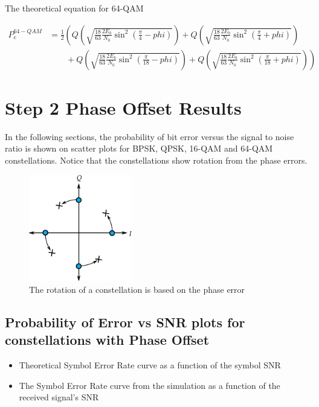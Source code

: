 \documentclass[]{article}
\begin{document}
The theoretical equation for 64-QAM

\begin{align}
P_{e}^{64-QAM} &= \frac{1}{2}\left(Q\left(\sqrt{\frac{18}{63}\frac{2E_b}{N_0}\sin^2\left(\frac{\pi}{4}-phi\right)}\right) + Q\left(\sqrt{\frac{18}{63}\frac{2E_b}{N_0}\sin^2\left(\frac{\pi}{4}+phi\right)}\right) \right. \nonumber \\
& \qquad \left. {} + Q\left(\sqrt{\frac{18}{63}\frac{2E_b}{N_0}\sin^2\left(\frac{\pi}{18}-phi\right)}\right) + Q\left(\sqrt{\frac{18}{63}\frac{2E_b}{N_0}\sin^2\left(\frac{\pi}{18}+phi\right)}\right) \right) 
\end{align}

\section{Step 2 Phase Offset Results}
\label{sec:results_po}
In the following sections, the probability of bit error versus the signal to noise ratio is shown on scatter plots for BPSK, QPSK, 16-QAM and 64-QAM constellations.  Notice that the constellations show rotation from the phase errors.  

\begin{figure}[H]
\centering
\hspace*{-2cm}\includegraphics[width=0.4\textwidth]{qpskError.png}
\caption{The rotation of a constellation is based on the phase error}
\end{figure}

\subsection{Probability of Error vs SNR plots for constellations with Phase Offset}
\begin{itemize}
\item Theoretical Symbol Error Rate curve as a function of the symbol SNR
\item The Symbol Error Rate curve from the simulation as a function of the received signal's SNR
\end{itemize}
\end{document}
